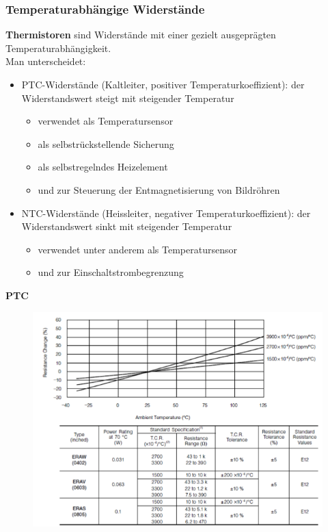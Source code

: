 \subsubsection{Temperaturabhängige Widerstände}
\textbf{Thermistoren} sind Widerstände mit einer gezielt ausgeprägten
Temperaturabhängigkeit.\\Man unterscheidet:
\begin{itemize}
  \item PTC-Widerstände (Kaltleiter, positiver Temperaturkoeffizient): der
  Widerstandswert steigt mit steigender Temperatur
  \begin{itemize}
    \item verwendet als Temperatursensor
    \item als selbstrückstellende Sicherung
    \item als selbstregelndes Heizelement
    \item und zur Steuerung der Entmagnetisierung von Bildröhren
  \end{itemize}
  \item NTC-Widerstände (Heissleiter, negativer Temperaturkoeffizient): der
  Widerstandswert sinkt mit steigender Temperatur
  \begin{itemize}
    \item verwendet unter anderem als Temperatursensor
    \item und zur Einschaltstrombegrenzung
  \end{itemize}
\end{itemize}

\textbf{PTC}\\
\begin{figure}[htbs]
\includegraphics[scale=0.5]{pictures/ptc}
\end{figure}

